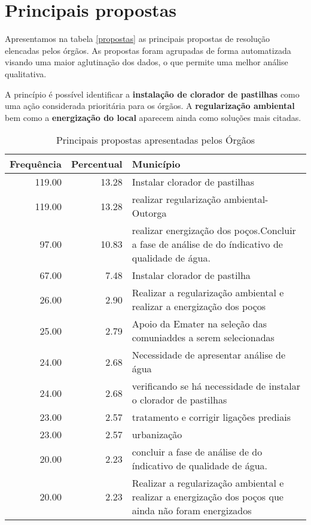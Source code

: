 \documentclass[a4paper, 12pt, openright, oneside, english, brazil, article]{abntex2}
\begin{document}
	
	\section{Principais propostas}
	
	Apresentamos na tabela \ref{propostas} as principais propostas de resolução elencadas pelos órgãos. As propostas foram agrupadas de forma automatizada visando uma maior aglutinação dos dados, o que permite uma melhor análise qualitativa.
	
	A princípio é possível identificar a \textbf{instalação de clorador de pastilhas} como uma ação considerada prioritária para os órgãos. A \textbf{regularização ambiental} bem como a \textbf{energização do local} aparecem ainda como soluções mais citadas.
	
	\begin{scriptsize}
		\begin{longtable}{rrp{11cm}}
			\caption{Principais propostas apresentadas pelos Órgãos} \\ 
			\hline
			Frequência & Percentual & Município \\ 
			\hline
			119.00 & 13.28 & Instalar clorador de pastilhas \\ 
			119.00 & 13.28 & realizar regularização ambiental-Outorga \\ 
			97.00 & 10.83 & realizar energização dos poços.Concluir a fase de análise de do índicativo de qualidade de água. \\ 
			67.00 & 7.48 & Instalar clorador de pastilha \\ 
			26.00 & 2.90 & Realizar a regularização ambiental e realizar a energização dos poços \\ 
			25.00 & 2.79 & Apoio da Emater na seleção das comuniaddes a serem selecionadas \\ 
			24.00 & 2.68 & Necessidade de apresentar análise de água \\ 
			24.00 & 2.68 & verificando se há necessidade de instalar o clorador de pastilhas \\ 
			23.00 & 2.57 & tratamento e corrigir ligações prediais \\ 
			23.00 & 2.57 & urbanização \\ 
			20.00 & 2.23 & concluir a fase de análise de do índicativo de qualidade de água. \\ 
			20.00 & 2.23 & Realizar a regularização ambiental e realizar a energização dos poços que ainda não foram energizados \\ 

\end{longtable}
\end{scriptsize}
\end{document}
